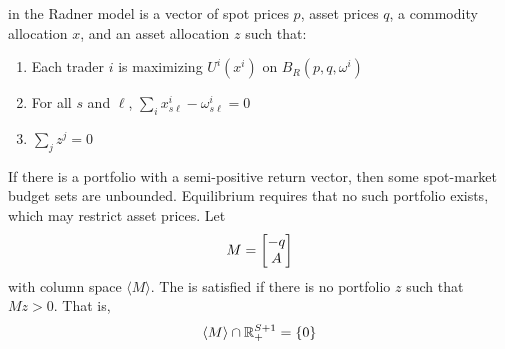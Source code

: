 \documentclass[10pt]{article}
\begin{document}
\begin{model}
	\begin{definition}
		 in the Radner model is a vector of spot prices $p$, asset prices $q$, a commodity allocation $x$, and an asset allocation $z$ such that:
		\begin{enumerate}
			\item Each trader $i$ is maximizing $U^i(x^i)$ on $B_R(p,q,\omega^i)$
			\item For all $s$ and $\ell$, $\sum_i x_{s\ell}^i - \omega_{s\ell}^i = 0$
			\item $\sum_j z^j =0$
		\end{enumerate}
	\end{definition}
	
	\begin{remark}
		If there is a portfolio with a semi-positive return vector, then some spot-market budget sets are unbounded. Equilibrium requires that no such portfolio exists, which may restrict asset prices. Let \[M = \begin{bmatrix}-q \\ A\end{bmatrix}\]with column space $\langle M \rangle$. The  is satisfied if there is no portfolio $z$ such that $Mz > 0$. That is, \[\langle M \rangle \cap \mathbb{R}^{S+1}_+ = \{0\}\]
	\end{remark}
\end{model}
\end{document}
